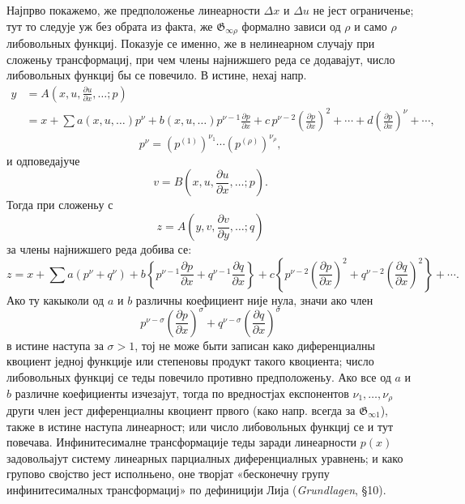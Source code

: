 ﻿\documentclass[11pt]{article}
\providecommand{\G}{\mathfrak G}
\providecommand{\D}{\Delta}
\providecommand{\p}{\partial}
\begin{document}
Најпрво покажемо, же предположенье линеарности \(\D x\) и \(\D u\) не јест ограниченье; тут то следује уж без обрата из факта, же \(\G_{\infty\rho}\) формално зависи од \(\rho\) и само \(\rho\) либовольных функциј. Показује се именно, же в нелинеарном случају при сложеньу трансформациј, при чем члены најнижшего реда се додавајут, число либовольных функциј бы се повечило. В истине, нехај напр.
\[
\begin{aligned}
y&=A\!\left(x,u,\frac{\p u}{\p x},\ldots;p\right)\\
&=x+\sum a(x,u,\ldots)p^\nu
+b(x,u,\ldots)p^{\nu-1}\frac{\p p}{\p x}
+c\,p^{\nu-2}\left(\frac{\p p}{\p x}\right)^2+\cdots
+d\left(\frac{\p p}{\p x}\right)^\nu+\cdots,
\end{aligned}
\]
\[
p^\nu=(p^{(1)})^{\nu_1}\cdots(p^{(\rho)})^{\nu_\rho},
\]
и одповедајуче
\[
v=B\!\left(x,u,\frac{\p u}{\p x},\ldots;p\right).
\]
Тогда при сложеньу с
\[
z=A\!\left(y,v,\frac{\p v}{\p y},\ldots;q\right)
\]
за члены најнижшего реда добива се:
\[
z=x+\sum a(p^\nu+q^\nu)+
b\left\{p^{\nu-1}\frac{\p p}{\p x}+q^{\nu-1}\frac{\p q}{\p x}\right\}
+c\left\{p^{\nu-2}\left(\frac{\p p}{\p x}\right)^2
+q^{\nu-2}\left(\frac{\p q}{\p x}\right)^2\right\}+\cdots.
\]
Ако ту какыколи од \(a\) и \(b\) различны коефициент није нула, значи ако член
\[
p^{\nu-\sigma}\left(\frac{\p p}{\p x}\right)^\sigma
+q^{\nu-\sigma}\left(\frac{\p q}{\p x}\right)^\sigma
\]
в истине наступа за \(\sigma>1\), тој не може быти записан како диференциалны квоциент једној функције или степеновы продукт такого квоциента; число либовольных функциј се теды повечило противно предположеньу. Ако все од \(a\) и \(b\) различне коефициенты изчезајут, тогда по вредностјах експонентов \(\nu_1,\ldots,\nu_\rho\) други член јест диференциалны квоциент првого (како напр. всегда за \(\G_{\infty1}\)), также в истине наступа линеарност; или число либовольных функциј се и тут повечава. Инфинитесималне трансформације теды заради линеарности \(p(x)\) задовольајут систему линеарных парциалных диференциалных уравнень; и како групово својство јест исполньено, оне творјат «бесконечну групу инфинитесималных трансформациј» по дефиницији Лија (\emph{Grundlagen}, \S{}10).
\end{document}
